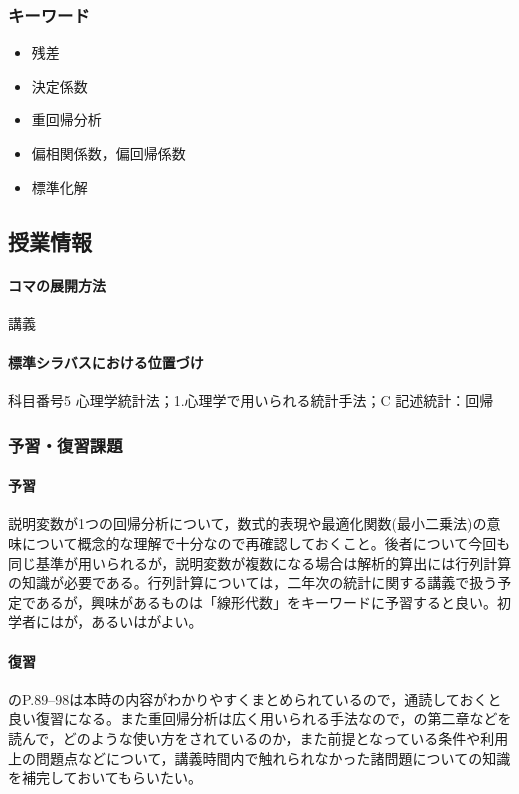 \subsubsection{キーワード}
\begin{itemize}
	\item 残差
	\item 決定係数
	\item 重回帰分析
	\item 偏相関係数，偏回帰係数
	\item 標準化解
\end{itemize}
\subsection{授業情報}
\paragraph{コマの展開方法}
講義
\paragraph{標準シラバスにおける位置づけ}
科目番号5 心理学統計法；1.心理学で用いられる統計手法；C 記述統計：回帰
\subsubsection{予習・復習課題}
\paragraph{予習}
説明変数が1つの回帰分析について，数式的表現や最適化関数(最小二乗法)の意味について概念的な理解で十分なので再確認しておくこと。後者について今回も同じ基準が用いられるが，説明変数が複数になる場合は解析的算出には行列計算の知識が必要である。行列計算については，二年次の統計に関する講義で扱う予定であるが，興味があるものは「線形代数」をキーワードに予習すると良い。初学者には\textcite{Yuki201810}が，あるいは\textcite{Okada200804}がよい。
\paragraph{復習}
\textcite{Toyoda201706}のP.89--98は本時の内容がわかりやすくまとめられているので，通読しておくと良い復習になる。また重回帰分析は広く用いられる手法なので，\textcite{kosugi2016a}の第二章などを読んで，どのような使い方をされているのか，また前提となっている条件や利用上の問題点などについて，講義時間内で触れられなかった諸問題についての知識を補完しておいてもらいたい。
